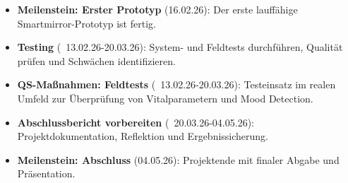 \begin{itemize}
    \item \textbf{Meilenstein: Erster Prototyp} (16.02.26): Der erste lauffähige Smartmirror-Prototyp ist fertig.
    \item \textbf{Testing} (~13.02.26-20.03.26): System- und Feldtests durchführen, Qualität prüfen und Schwächen identifizieren.
    \item \textbf{QS-Maßnahmen: Feldtests} (~13.02.26-20.03.26): Testeinsatz im realen Umfeld zur Überprüfung von Vitalparametern und Mood Detection.
    \item \textbf{Abschlussbericht vorbereiten} (~20.03.26-04.05.26): Projektdokumentation, Reflektion und Ergebnissicherung.
    \item \textbf{Meilenstein: Abschluss} (04.05.26): Projektende mit finaler Abgabe und Präsentation.
\end{itemize}

